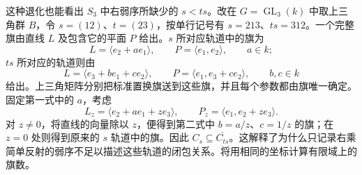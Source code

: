 \ProseParagraphBreak
这种退化也能看出 \(S_3\) 中右弱序所缺少的 \(s<ts\)。改在 \(G=\operatorname{GL}_3(k)\) 中取上三角群 \(B\)，令 \(s=(12)\)、\(t=(23)\)，按单行记号有 \(s=213\)、\(ts=312\)。一个完整旗由直线 \(L\) 及包含它的平面 \(P\) 给出。\(s\) 所对应轨道中的旗为
\[
	L=\langle e_2+a e_1\rangle, \qquad P=\langle e_1,e_2\rangle, \qquad a\in k;
\]
\(ts\) 所对应的轨道则由
\[
	L=\langle e_3+b e_1+c e_2\rangle, \qquad P=\langle e_1,e_3+c e_2\rangle, \qquad b,c\in k
\]
给出。上三角矩阵分别把标准置换旗送到这些旗，并且每个参数都由旗唯一确定。固定第一式中的 \(a\)，考虑
\[
	L_z=\langle e_2+a e_1+z e_3\rangle, \qquad P_z=\langle e_1,e_2+z e_3\rangle.
\]
对 \(z\ne0\)，将直线的向量除以 \(z\)，便得到第二式中 \(b=a/z\)、\(c=1/z\) 的旗；在 \(z=0\) 处则得到原来的 \(s\) 轨道中的旗。因此 \(C_s\subseteq\overline{C_{ts}}\)。这解释了为什么只记录右乘简单反射的弱序不足以描述这些轨道的闭包关系。将用相同的坐标计算有限域上的旗数。

